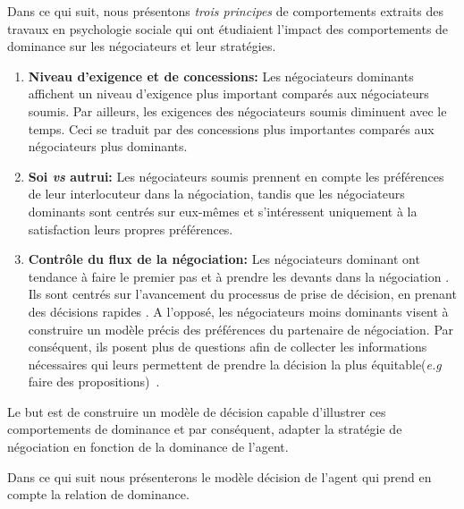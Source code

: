 	Dans ce qui suit, nous présentons \emph{trois principes} de comportements extraits des travaux en psychologie sociale qui ont étudiaient l'impact des comportements de dominance sur les négociateurs et leur stratégies.
	
	\begin{enumerate}
		\item \textbf{Niveau d'exigence et de concessions:} Les négociateurs dominants affichent un niveau d'exigence plus important comparés aux négociateurs soumis. Par ailleurs, les exigences des négociateurs soumis diminuent avec le temps. Ceci se traduit par des concessions plus importantes comparés aux négociateurs plus dominants. \cite{de1995impact}
		
		\item \textbf{Soi \emph{vs} autrui:} Les négociateurs soumis prennent en compte les préférences de leur interlocuteur dans la négociation, tandis que les négociateurs  dominants sont centrés sur eux-mêmes et s'intéressent uniquement à la satisfaction leurs propres préférences. \cite{fiske1993controlling,de1995impact}
		
		\item \textbf{Contrôle du flux de la négociation:}
		Les négociateurs dominant ont tendance à faire le premier pas et à prendre les devants dans la négociation \cite {magee2007power}. Ils sont centrés sur l'avancement du processus de prise de décision, en prenant des décisions rapides \cite{zablotskaya2012relating}.
		A l'opposé, les négociateurs moins dominants visent à construire un modèle précis des préférences du partenaire de négociation. 
		Par conséquent,  ils posent plus de questions afin de collecter les informations nécessaires qui leurs permettent de prendre la décision la plus équitable(\emph{e.g}  faire des propositions)~\cite{de2004influence}. 
		
	\end{enumerate}
	
	
	Le but est de construire un modèle de décision capable d'illustrer ces comportements de dominance et par conséquent, adapter la stratégie de négociation en fonction de la dominance de l'agent.
	
	Dans ce qui suit nous présenterons le modèle décision de l'agent qui prend en compte la relation de dominance.
	
	
